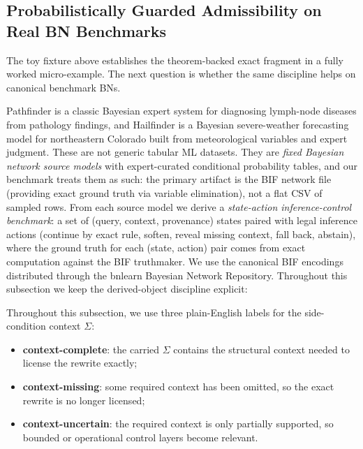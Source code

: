 \documentclass[11pt,openany]{report}
\begin{document}
\subsection{Probabilistically Guarded Admissibility on Real BN Benchmarks}

The toy fixture above establishes the theorem-backed exact fragment in a
fully worked micro-example.  The next question is whether the same
discipline helps on canonical benchmark BNs.

Pathfinder is a classic Bayesian expert system for diagnosing lymph-node
diseases from pathology findings,\cite{Heckerman1992Pathfinder} and
Hailfinder is a Bayesian severe-weather forecasting model for northeastern
Colorado built from meteorological variables and expert
judgment.\cite{Abramson1996Hailfinder}
These are not generic tabular ML datasets.  They are \emph{fixed Bayesian
network source models} with expert-curated conditional probability tables,
and our benchmark treats them as such: the primary artifact is the BIF
network file (providing exact ground truth via variable elimination), not
a flat CSV of sampled rows.  From each source model we derive a
\emph{state-action inference-control benchmark}: a set of (query, context,
provenance) states paired with legal inference actions (continue by exact
rule, soften, reveal missing context, fall back, abstain), where the
ground truth for each (state, action) pair comes from exact computation
against the BIF truthmaker.
We use the canonical BIF encodings distributed through the bnlearn
Bayesian Network Repository.\cite{ScutariBnRepository}
Throughout this subsection we keep the derived-object discipline explicit:
\smallskip

Throughout this subsection, we use three plain-English labels for the
side-condition context $\Sigma$:
\begin{itemize}
\item \textbf{context-complete}: the carried $\Sigma$ contains the
  structural context needed to license the rewrite exactly;
\item \textbf{context-missing}: some required context has been omitted,
  so the exact rewrite is no longer licensed;
\item \textbf{context-uncertain}: the required context is only
  partially supported, so bounded or operational control layers become
  relevant.
\end{itemize}
\end{document}
